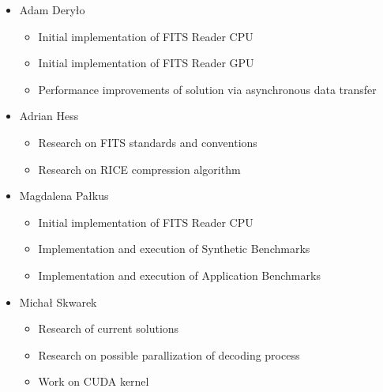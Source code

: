 \documentclass[licencjacka,en]{pracamgr}
\begin{document}
\begin{itemize}
    \item Adam Deryło 
    \begin{itemize}
        \item Initial implementation of FITS Reader CPU
        \item Initial implementation of FITS Reader GPU
        \item Performance improvements of solution via asynchronous data transfer
    \end{itemize}

    \item Adrian Hess
    \begin{itemize}
        \item Research on FITS standards and conventions
        \item Research on RICE compression algorithm 
    \end{itemize}

    \item Magdalena Pałkus 
    \begin{itemize}
        \item  Initial implementation of FITS 
        Reader CPU
        \item  Implementation and execution of Synthetic Benchmarks 
        \item Implementation and execution of Application Benchmarks 
    \end{itemize}    

    \item Michał Skwarek 
    \begin{itemize}
        \item  Research of current solutions
        \item Research on possible parallization of decoding process
        \item Work on CUDA kernel
        
    \end{itemize}   
\end{itemize}
\end{document}
